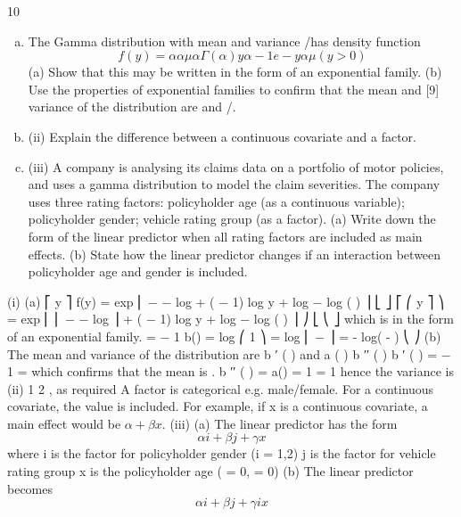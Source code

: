 \documentclass[a4paper,12pt]{article}
\begin{document}
10
\begin{enumerate}[(a)]
\item The Gamma distribution with mean \mu  and variance  /\alpha  has density function
\[f(y) =
\alpha  \alpha 
\mu  \alpha  \Gamma ( \alpha  )
y
\alpha − 1
e
−
y \alpha 
\mu 
( y > 0 )\]
(a) Show that this may be written in the form of an exponential family.
(b) Use the properties of exponential families to confirm that the mean and
[9]
variance of the distribution are \mu  and  /\alpha .
\item  (ii) Explain the difference between a continuous covariate and a factor.

\item (iii) A company is analysing its claims data on a portfolio of motor policies, and uses a gamma distribution to model the claim severities. The company uses
three rating factors:
policyholder age (as a continuous variable);
policyholder gender;
vehicle rating group (as a factor).
(a) Write down the form of the linear predictor when all rating factors are included as main effects.
(b) State how the linear predictor changes if an interaction between
policyholder age and gender is included.
\end{enumerate}
\newpage

(i) (a)
⎡ y \alpha 
⎤
f(y) = exp ⎢ −
− \alpha  log \mu  + ( \alpha  − 1) log y + \alpha  log \alpha  − log \Gamma ( \alpha  ) ⎥
⎣ \mu 
⎦
⎡ ⎛ y
⎤
⎞
= exp ⎢ \alpha  ⎜ − − log \mu  ⎟ + ( \alpha  − 1) log y + \alpha  log \alpha  − log \Gamma ( \alpha  ) ⎥
⎠
⎣ ⎝ \mu 
⎦
which is in the form of an exponential family.
\theta  = −
1
\mu 
b(\theta ) = log \mu 
⎛ 1 ⎞
= log ⎜ − ⎟ = - log( - \theta )
⎝ \theta  ⎠
(b)
The mean and variance of the distribution are b ′ ( \theta  ) and a ( \phi  ) b ′′ ( \theta  )
b ′ ( \theta  ) = −
1
= \mu 
\theta 
which confirms that the mean is \mu .
b ′′ ( \theta  ) =
a(\phi ) =
1
= 
1
\alpha 
hence the variance is
(ii)
1 2
\mu  , as required
\alpha 
A factor is categorical e.g. male/female.
For a continuous covariate, the value is included. For example, if x is a continuous covariate, a main effect would be $\alpha  + \beta x$.
(iii)
(a)
The linear predictor has the form
\[\alpha  i + \beta j + \gamma x\]
where \alpha  i is the factor for policyholder gender (i = 1,2)
\beta j is the factor for vehicle rating group
x is the policyholder age
( = 0,  = 0)
(b)
The linear predictor becomes
\[\alpha  i + \beta j + \gamma i x\]
\end{document}
